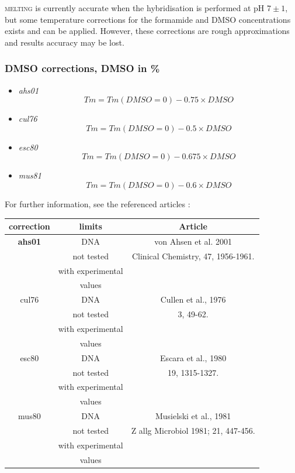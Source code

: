 \documentclass{article}
\begin{document}
\textsc{melting} is currently accurate when the hybridisation is performed at pH $7\pm 1$,  
but some temperature corrections for the formamide and DMSO concentrations exists and can be
applied. However, these corrections are rough approximations and results accuracy may be lost.

\subsubsection{DMSO corrections, DMSO in \%}
  \begin{itemize}
  \item \textit{ahs01}
  \begin{displaymath}
  Tm=Tm(DMSO=0)-0.75 \times DMSO
  \end{displaymath}
  \item \textit{cul76}
  \begin{displaymath}
  Tm=Tm(DMSO=0)-0.5 \times DMSO
  \end{displaymath}
  \item \textit{esc80}
  \begin{displaymath}
  Tm=Tm(DMSO=0)-0.675 \times DMSO
  \end{displaymath}
  \item \textit{mus81}
  \begin{displaymath}
  Tm=Tm(DMSO=0)-0.6 \times DMSO
  \end{displaymath}
  \end{itemize}
 
For further information, see the referenced articles :
\begin{table}[hc]
\begin{tabular}[h]{| c | c | c |}
\textbf{correction} & \textbf{limits} & \textbf{Article} \\ 
\hline
\textbf{ahs01} & DNA & von Ahsen et al. 2001 \\
 & not tested & Clinical Chemistry, 47, 1956-1961. \\
 & with experimental & \\
 & values & \\
 \hline
cul76 & DNA & Cullen et al., 1976 \\
 & not tested & 3, 49-62.\\
 & with experimental & \\
 & values & \\
 \hline
esc80 & DNA & Escara et al., 1980 \\
 & not tested & 19, 1315-1327.\\
 & with experimental & \\
 & values & \\
 \hline
mus80 & DNA & Musielski et al., 1981 \\
 & not tested & Z allg Microbiol 1981; 21, 447-456.\\
 & with experimental & \\
 & values & \\
 \hline
\end{tabular}
\end{table}
 
\end{document}
